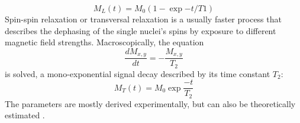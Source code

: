        \begin{equation}
            M_L(t) = M_0(1 - \exp{-t/T1})
        \end{equation}
        Spin-spin relaxation or transversal relaxation is a usually faster process that describes the dephasing of the single nuclei's spins by exposure to different magnetic field strengths. Macroscopically, the equation
        \begin{equation}
        \frac{dM_{x,y}}{dt} = - \frac{M_{x,y}}{T_2}
        \end{equation}
        is solved, a mono-exponential signal decay described by its time constant $T_2$:
        \begin{equation}
            M_T(t) = M_0\exp{\frac{-t}{T_2}}
        \end{equation}
        The parameters are mostly derived experimentally, but can also be theoretically estimated \cite{kaupp_calculation_2003}.
